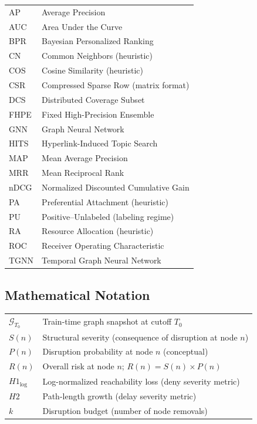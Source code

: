 \begin{tabular}{@{}l l@{}}
AP      & Average Precision \\
AUC     & Area Under the Curve \\
BPR     & Bayesian Personalized Ranking \\
CN      & Common Neighbors (heuristic) \\
COS     & Cosine Similarity (heuristic) \\
CSR     & Compressed Sparse Row (matrix format) \\
DCS     & Distributed Coverage Subset \\
FHPE    & Fixed High-Precision Ensemble \\
GNN     & Graph Neural Network \\
HITS    & Hyperlink-Induced Topic Search \\
MAP     & Mean Average Precision \\
MRR     & Mean Reciprocal Rank \\
nDCG    & Normalized Discounted Cumulative Gain \\
PA      & Preferential Attachment (heuristic) \\
PU      & Positive--Unlabeled (labeling regime) \\
RA      & Resource Allocation (heuristic) \\
ROC     & Receiver Operating Characteristic \\
TGNN    & Temporal Graph Neural Network \\
\end{tabular}

\subsection*{Mathematical Notation}

\begin{tabular}{@{}l l@{}}
$\mathcal{G}_{T_0}$ & Train-time graph snapshot at cutoff $T_0$ \\
$S(n)$  & Structural severity (consequence of disruption at node $n$) \\
$P(n)$  & Disruption probability at node $n$ (conceptual) \\
$R(n)$  & Overall risk at node $n$; $R(n) = S(n) \times P(n)$ \\
$H1_{\log}$ & Log-normalized reachability loss (deny severity metric) \\
$H2$    & Path-length growth (delay severity metric) \\
$k$     & Disruption budget (number of node removals) \\
\end{tabular}

